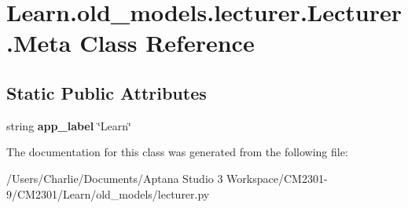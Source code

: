 \hypertarget{class_learn_1_1old__models_1_1lecturer_1_1_lecturer_1_1_meta}{\section{Learn.\-old\-\_\-models.\-lecturer.\-Lecturer.\-Meta Class Reference}
\label{class_learn_1_1old__models_1_1lecturer_1_1_lecturer_1_1_meta}
}
\subsection*{Static Public Attributes}
\begin{DoxyCompactItemize}
\item 
\hypertarget{class_learn_1_1old__models_1_1lecturer_1_1_lecturer_1_1_meta_af686033849a880e4c71d95cb1b1555ac}{string {\bfseries app\-\_\-label} \char`\"{}Learn\char`\"{}}\label{class_learn_1_1old__models_1_1lecturer_1_1_lecturer_1_1_meta_af686033849a880e4c71d95cb1b1555ac}

\end{DoxyCompactItemize}


The documentation for this class was generated from the following file\-:\begin{DoxyCompactItemize}
\item 
/\-Users/\-Charlie/\-Documents/\-Aptana Studio 3 Workspace/\-C\-M2301-\/9/\-C\-M2301/\-Learn/old\-\_\-models/lecturer.\-py\end{DoxyCompactItemize}
